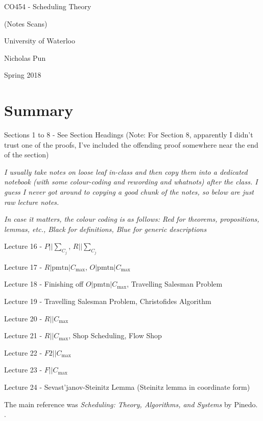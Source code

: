 \documentclass[12pt]{article}
\begin{document}
\begin{titlepage}
  \centering
  \vspace*{2in}
  {\huge CO454 - Scheduling Theory}\par
  {\Large (Notes Scans)}\par
  \vspace{0.3in}
  {\large University of Waterloo}\par
  {\large Nicholas Pun}\par
  {\large Spring 2018}\par 
\end{titlepage}
 
\tableofcontents
\clearpage

\section*{Summary}
Sections 1 to 8 - See Section Headings (Note: For Section 8, apparently I didn't trust one of the proofs, I've included the offending proof somewhere near the end of the section)

\textit{I usually take notes on loose leaf in-class and then copy them into a dedicated notebook (with some colour-coding and rewording and whatnots) after the class.
I guess I never got around to copying a good chunk of the notes, so below are just raw lecture notes.}

\textit{In case it matters, the colour coding is as follows: Red for theorems, propositions, lemmas, etc., Black for definitions, Blue for generic descriptions}

Lecture 16 - $P||\sum_{C_j}$, $R||\sum_{C_j}$ 

Lecture 17 - $R|\mathrm{pmtn}|C_{\max}$, $O|\mathrm{pmtn}|C_{\max}$

Lecture 18 - Finishing off $O|\mathrm{pmtn}|C_{\max}$, Travelling Salesman Problem

Lecture 19 - Travelling Salesman Problem, Christofides Algorithm

Lecture 20 - $R||C_{\max}$

Lecture 21 - $R||C_{\max}$, Shop Scheduling, Flow  Shop

Lecture 22 - $F2||C_{\max}$

Lecture 23 - $F||C_{\max}$

Lecture 24 - Sevast'janov-Steinitz Lemma (Steinitz lemma in coordinate form)

The main reference was \textit{Scheduling: Theory, Algorithms, and Systems} by Pinedo.
.
\clearpage
\end{document}
